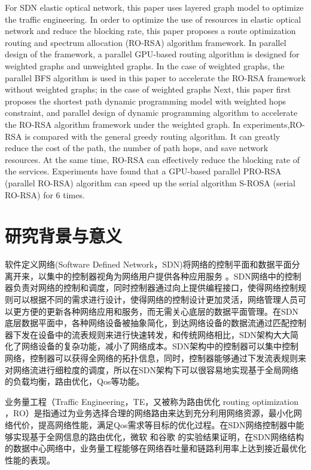 \documentclass[master]{thesis-uestc}
\begin{document}
\begin{englishabstract}
For SDN elastic optical network, this paper uses layered graph model to optimize the traffic engineering. In order to optimize the use of resources in elastic optical network and reduce the blocking rate, this paper proposes a route optimization routing and spectrum allocation (RO-RSA) algorithm framework. In parallel design of the framework, a parallel GPU-based routing algorithm is designed for weighted graphs and unweighted graphs. In the case of weighted graphs, the parallel BFS algorithm is used in this paper to accelerate the RO-RSA framework without weighted graphs; in the case of weighted graphs Next, this paper first proposes the shortest path dynamic programming model with weighted hops constraint, and parallel design of dynamic programming algorithm to accelerate the RO-RSA algorithm framework under the weighted graph. In experiments,RO-RSA is compared with the general greedy routing algorithm. It can greatly reduce the cost of the path, the number of path hops, and save network resources. At the same time, RO-RSA can effectively reduce the blocking rate of the services. Experiments have found that a GPU-based parallel PRO-RSA (parallel RO-RSA) algorithm can speed up the serial algorithm S-ROSA (serial RO-RSA) for 6 times.


\end{englishabstract}
\thesistableofcontents
\thesisfigurelist
\thesistablelist
\thesischapterexordium
\section{研究背景与意义}
软件定义网络(Software Defined Network，SDN)将网络的控制平面和数据平面分离开来，以集中的控制器视角为网络用户提供各种应用服务  。SDN网络中的控制器负责对网络的控制和调度，同时控制器通过向上提供编程接口，使得网络控制规则可以根据不同的需求进行设计，使得网络的控制设计更加灵活，网络管理人员可以更方便的更新各种网络应用和服务，而无需关心底层的数据平面管理。在SDN底层数据平面中，各种网络设备被抽象简化，到达网络设备的数据流通过匹配控制器下发在设备中的流表规则来进行快速转发，和传统网络相比，SDN架构大大简化了网络设备的复杂功能，减小了网络成本。SDN架构中的控制器可以集中控制网络，控制器可以获得全网络的拓扑信息，同时，控制器能够通过下发流表规则来对网络流进行细粒度的调度，所以在SDN架构下可以很容易地实现基于全局网络的负载均衡，路由优化，Qos等功能。

业务量工程（Traffic Engineering，TE，又被称为路由优化 routing optimization ，RO）是指通过为业务选择合理的网络路由来达到充分利用网络资源，最小化网络代价，提高网络性能，满足Qos需求等目标的优化过程。在SDN网络控制器中能够实现基于全网信息的路由优化，微软 和谷歌 的实验结果证明，在SDN网络结构的数据中心网络中，业务量工程能够在网络吞吐量和链路利用率上达到接近最优化性能的表现。
\end{document}
